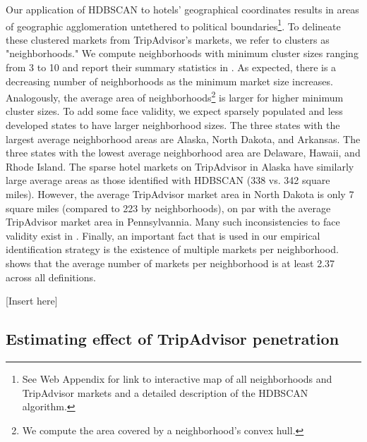 \documentclass[mksc,blindrev]{informs3} %
\begin{document}
Our application of HDBSCAN to hotels' geographical coordinates results in areas of geographic agglomeration untethered to political boundaries\footnote{See Web Appendix for link to interactive map of all neighborhoods and TripAdvisor markets and a detailed description of the HDBSCAN algorithm.}. To delineate these clustered markets from TripAdvisor's markets, we refer to clusters as "neighborhoods." We compute neighborhoods with minimum cluster sizes ranging from 3 to 10 and report their summary statistics in . As expected, there is a decreasing number of neighborhoods as the minimum market size increases. Analogously, the average area of neighborhoods\footnote{We compute the area covered by a neighborhood's convex hull.} is larger for higher minimum cluster sizes. To add some face validity, we expect sparsely populated and less developed states to have larger neighborhood sizes. The three states with the largest average neighborhood areas are Alaska, North Dakota, and Arkansas. The three states with the lowest average neighborhood area are Delaware, Hawaii, and Rhode Island. The sparse hotel markets on TripAdvisor in Alaska have similarly large average areas as those identified with HDBSCAN (338 vs. 342 square miles). However, the average TripAdvisor market area in North Dakota is only 7 square miles (compared to 223 by neighborhoods), on par with the average TripAdvisor market area in Pennsylvannia. Many such inconsistencies to face validity exist in . Finally, an important fact that is used in our empirical identification strategy is the existence of multiple markets per neighborhood.  shows that the average number of markets per neighborhood is at least 2.37 across all definitions.

[Insert  here]

\subsection{Estimating effect of TripAdvisor penetration}
\end{document}
